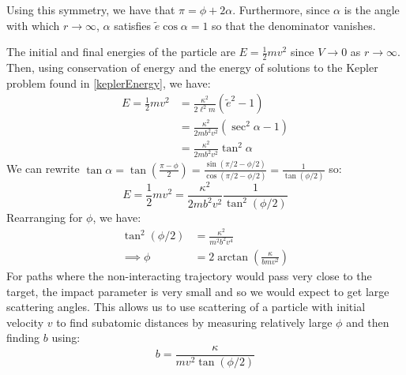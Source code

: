 \documentclass[../main.tex]{subfiles}
\begin{document}
Using this symmetry, we have that $\pi = \phi + 2\alpha$.
Furthermore, since $\alpha$ is the angle with which $r \to \infty$, $\alpha$ satisfies $\widetilde{e}\cos \alpha = 1$ so that the denominator vanishes.

The initial and final energies of the particle are $E = \frac{1}{2}mv^2$ since $V \to 0$ as $r \to \infty$.
Then, using conservation of energy and the energy of solutions to the Kepler problem found in \cref{keplerEnergy}, we have:
\begin{align*}
  E = \frac{1}{2}mv^2 &= \frac{\kappa^2}{2\ell^2 m}(\widetilde{e}^2 - 1) \\
                      &= \frac{\kappa^2}{2mb^2v^2}(\sec^2\alpha - 1) \\
                      &= \frac{\kappa^2}{2mb^2v^2}\tan^2\alpha
\end{align*}
We can rewrite $\tan \alpha = \tan(\frac{\pi - \phi}{2}) = \frac{\sin(\pi/2 - \phi/2)}{\cos(\pi/2 - \phi/2)} = \frac{1}{\tan(\phi/2)}$ so:
\[
  E = \frac{1}{2}mv^2 = \frac{\kappa^2}{2mb^2v^2}\frac{1}{\tan^2(\phi/2)}
\]
Rearranging for $\phi$, we have:
\begin{align*}
  \tan^2(\phi/2) &= \frac{\kappa^2}{m^2b^2v^4} \\
  \implies \phi &= 2 \arctan\left(\frac{\kappa}{bmv^2}\right)
\end{align*}
For paths where the non-interacting trajectory would pass very close to the target, the impact parameter is very small and so we would expect to get large scattering angles.
This allows us to use scattering of a particle with initial velocity $v$ to find subatomic distances by measuring relatively large $\phi$ and then finding $b$ using:
\[
  b = \frac{\kappa}{mv^2 \tan(\phi/2)}
\]
\end{document}
